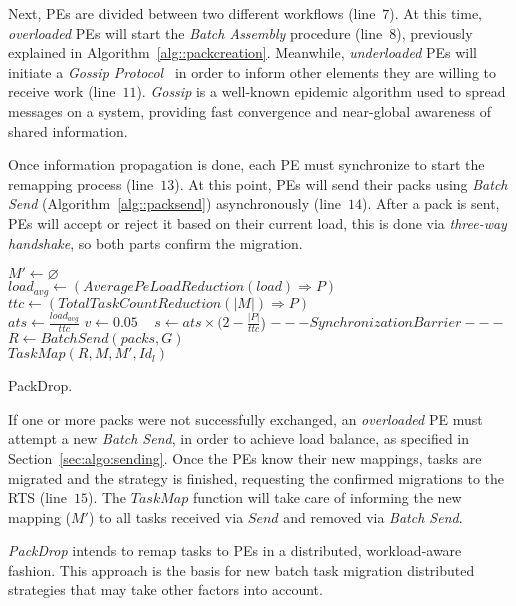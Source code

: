 Next, PEs are divided between two different workflows (line~$7$).
At this time, \textit{overloaded} PEs will start the \textit{Batch Assembly} procedure (line~$8$), previously explained in Algorithm~\ref{alg::packcreation}.
Meanwhile, \textit{underloaded} PEs will initiate a \textit{Gossip Protocol}~\cite{gossip} in order to inform other elements they are willing to receive work (line~$11$).
\textit{Gossip} is a well-known epidemic algorithm used to spread messages on a system, providing fast convergence and near-global awareness of shared information.

Once information propagation is done, each PE must synchronize to start the remapping process (line~$13$). 
At this point, PEs will send their packs using \textit{Batch Send} (Algorithm~\ref{alg::packsend}) asynchronously (line~$14$).
After a pack is sent, PEs will accept or reject it based on their current load, this is done via \textit{three-way handshake}, so both parts confirm the migration.

\begin{algorithm}[t]
	\DontPrintSemicolon
    $  M' \gets \varnothing$\\
    $load_{avg} \gets (AveragePeLoadReduction(load)\Rightarrow  P)$ \\
    $ttc \gets (TotalTaskCountReduction(|M|)\Rightarrow  P)$\\
    $ats\gets \frac{load_{avg}}{ttc}$ \qquad\qquad\qquad {}
    $v \gets 0.05$ \qquad \qquad\ 
    $s \gets ats\times (2-\frac{|  P|}{ttc}$) \qquad\qquad\qquad\qquad {}
    $---Synchronization Barrier---$\\
    $R \gets BatchSend(packs, G)$\\
    $TaskMap(R,M, M',Id_{l})$
    \caption{PackDrop.}
    \label{alg::packdrop}    
\end{algorithm}

If one or more packs were not successfully exchanged, an \textit{overloaded} PE must attempt a new \textit{Batch Send}, in order to achieve load balance, as specified in Section~\ref{sec:algo:sending}.
Once the PEs know their new mappings, tasks are migrated and the strategy is finished, requesting the confirmed migrations to the RTS (line~$15$). 
The $TaskMap$ function will take care of informing the new mapping ($M'$) to all tasks received via $Send$ and removed via \textit{Batch Send}.

\textit{PackDrop} intends to remap tasks to PEs in a distributed, workload-aware fashion.
This approach is the basis for new batch task migration distributed strategies that may take other factors into account.

